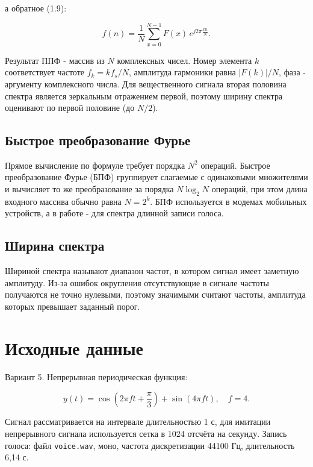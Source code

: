 \documentclass[a4paper,14pt,oneside,openany]{memoir}
\begin{document}
а обратное (1.9):

\begin{equation*}
f(n) = \frac{1}{N} \sum_{x=0}^{N-1} F(x)\, e^{j 2\pi \frac{x n}{N}}.
\end{equation*}

Результат ППФ - массив из $N$ комплексных чисел. Номер элемента $k$ соответствует частоте $f_k = k f_s / N$, амплитуда гармоники равна $|F(k)|/N$, фаза - аргументу комплексного числа. Для вещественного сигнала вторая половина спектра является зеркальным отражением первой, поэтому ширину спектра оценивают по первой половине (до $N/2$).

\subsection{Быстрое преобразование Фурье}

Прямое вычисление по формуле требует порядка $N^2$ операций. Быстрое преобразование Фурье (БПФ) группирует слагаемые с одинаковыми множителями и вычисляет то же преобразование за порядка $N \log_2 N$ операций, при этом длина входного массива обычно равна $N = 2^k$. БПФ используется в модемах мобильных устройств, а в работе - для спектра длинной записи голоса.

\subsection{Ширина спектра}

Шириной спектра называют диапазон частот, в котором сигнал имеет заметную амплитуду. Из-за ошибок округления отсутствующие в сигнале частоты получаются не точно нулевыми, поэтому значимыми считают частоты, амплитуда которых превышает заданный порог.

\section{Исходные данные}

Вариант 5. Непрерывная периодическая функция:

\begin{equation*}
y(t) = \cos\left(2\pi f t + \frac{\pi}{3}\right) + \sin(4\pi f t), \quad f = 4.
\end{equation*}

Сигнал рассматривается на интервале длительностью 1 с, для имитации непрерывного сигнала используется сетка в 1024 отсчёта на секунду. Запись голоса: файл \texttt{voice.wav}, моно, частота дискретизации 44100 Гц, длительность 6,14 с.
\end{document}
